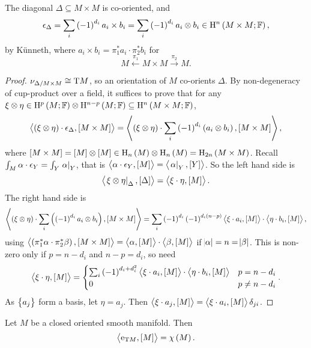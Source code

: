\begin{proposition}
The diagonal $ \Delta \subseteq M \times M $ is co-oriented, and
$$ \epsilon_\Delta = \sum_i \br{-1}^{d_i} a_i \times b_i = \sum_i \br{-1}^{d_i} a_i \otimes b_i \in \H^n\br{M \times M; \FF}, $$
by K\"unneth, where $ a_i \times b_i = \pi_1^*a_i \cdot \pi_2^*b_i $ for
$$ M \xleftarrow{\pi_1} M \times M \xrightarrow{\pi_2} M. $$
\end{proposition}

\begin{proof}
$ \nu_{\Delta / M \times M} \cong \mathrm{T} M $, so an orientation of $ M $ co-orients $ \Delta $. By non-degeneracy of cup-product over a field, it suffices to prove that for any $ \xi \otimes \eta \in \H^p\br{M; \FF} \otimes \H^{n - p}\br{M; \FF} \subseteq \H^n\br{M \times M; \FF} $,
$$ \abr{\br{\xi \otimes \eta} \cdot \epsilon_\Delta, \sbr{M \times M}} = \abr{\br{\xi \otimes \eta} \cdot \sum_i \br{-1}^{d_i} \br{a_i \otimes b_i}, \sbr{M \times M}}, $$
where $ \sbr{M \times M} = \sbr{M} \otimes \sbr{M} \in \H_n\br{M} \otimes \H_n\br{M} = \H_{2n}\br{M \times M} $. Recall $ \int_M \alpha \cdot \epsilon_Y = \int_Y \left. \alpha \right|_Y $, that is $ \abr{\alpha \cdot \epsilon_Y, \sbr{M}} = \abr{\eval{\alpha}_Y, \sbr{Y}} $. So the left hand side is
$$ \abr{\eval{\xi \otimes \eta}_\Delta, \sbr{\Delta}} = \abr{\xi \cdot \eta, \sbr{M}}. $$
The right hand side is
$$ \abr{\br{\xi \otimes \eta} \cdot \sum_i \br{\br{-1}^{d_i} a_i \otimes b_i}, \sbr{M \times M}} = \sum_i \br{-1}^{d_i}\br{-1}^{d_i\br{n - p}}\abr{\xi \cdot a_i, \sbr{M}} \cdot \abr{\eta \cdot b_i, \sbr{M}}, $$
using $ \abr{\br{\pi_1^*\alpha \cdot \pi_2^*\beta}, \sbr{M \times M}} = \abr{\alpha, \sbr{M}} \cdot \abr{\beta, \sbr{M}} $ if $ \abs{\alpha} = n = \abs{\beta} $. This is non-zero only if $ p = n - d_i $ and $ n - p = d_i $, so need
$$ \abr{\xi \cdot \eta, \sbr{M}} =
\begin{cases}
\sum_i \br{-1}^{d_i + d_i^2}\abr{\xi \cdot a_i, \sbr{M}} \cdot \abr{\eta \cdot b_i, \sbr{M}} & p = n - d_i \\
0 & p \ne n - d_i
\end{cases}.
$$
As $ \cbr{a_j} $ form a basis, let $ \eta = a_j $. Then $ \abr{\xi \cdot a_j, \sbr{M}} = \abr{\xi \cdot a_i, \sbr{M}}\delta_{ji} $.
\end{proof}

\pagebreak

\begin{corollary}
Let $ M $ be a closed oriented smooth manifold. Then
$$ \abr{\e_{\T M}, \sbr{M}} = \chi\br{M}. $$
\end{corollary}

